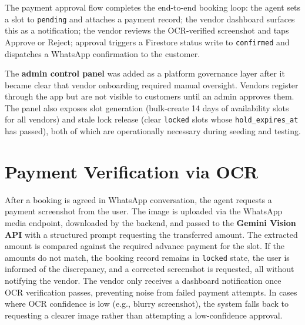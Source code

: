 The payment approval flow completes the end-to-end booking loop: the agent sets a slot to \texttt{pending} and attaches a payment record; the vendor dashboard surfaces this as a notification; the vendor reviews the OCR-verified screenshot and taps Approve or Reject; approval triggers a Firestore status write to \texttt{confirmed} and dispatches a WhatsApp confirmation to the customer.

The \textbf{admin control panel} was added as a platform governance layer after it became clear that vendor onboarding required manual oversight. Vendors register through the app but are not visible to customers until an admin approves them. The panel also exposes slot generation (bulk-create 14 days of availability slots for all vendors) and stale lock release (clear \texttt{locked} slots whose \texttt{hold\_expires\_at} has passed), both of which are operationally necessary during seeding and testing.

\section{Payment Verification via OCR}
\label{sec:dev-ocr}

After a booking is agreed in WhatsApp conversation, the agent requests a payment screenshot from the user. The image is uploaded via the WhatsApp media endpoint, downloaded by the backend, and passed to the \textbf{Gemini Vision API} with a structured prompt requesting the transferred amount. The extracted amount is compared against the required advance payment for the slot. If the amounts do not match, the booking record remains in \texttt{locked} state, the user is informed of the discrepancy, and a corrected screenshot is requested, all without notifying the vendor. The vendor only receives a dashboard notification once OCR verification passes, preventing noise from failed payment attempts. In cases where OCR confidence is low (e.g., blurry screenshot), the system falls back to requesting a clearer image rather than attempting a low-confidence approval.

